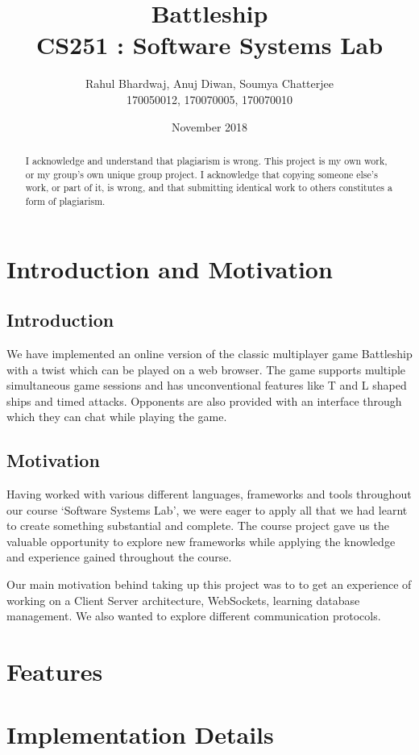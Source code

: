 \documentclass[titlepage]{article}
\title{\textbf{Battleship} \\ CS251 : Software Systems Lab}
\author{Rahul Bhardwaj, Anuj Diwan, Soumya Chatterjee \\ 170050012, 170070005, 170070010}
\date{November 2018}
\begin{document}
\maketitle

\begin{abstract}
I acknowledge and understand that plagiarism is wrong. This project is my own work, or my group’s own unique group project. I acknowledge that copying someone else's work, or part of it, is wrong, and that submitting identical work to others constitutes a form of plagiarism.
\end{abstract}

\tableofcontents

\break

\section{Introduction and Motivation}
\subsection{Introduction}
We have implemented an online version of the classic multiplayer game Battleship with a twist which can be played on a web browser. The game supports multiple simultaneous game sessions and has unconventional features like T and L shaped ships and timed attacks. Opponents are also provided with an interface through which they can chat while playing the game.

\subsection{Motivation}
Having worked with various different languages, frameworks and tools throughout our course `Software Systems Lab', we were eager to apply all that we had learnt to create something substantial and complete. The course project gave us the valuable opportunity to explore new frameworks while applying the knowledge and experience gained throughout the course.

Our main motivation behind taking up this project was to to get an experience of working on a Client Server architecture, WebSockets, learning database management. We also wanted to explore different communication protocols.
\section{Features}

\section{Implementation Details}
\end{document}
